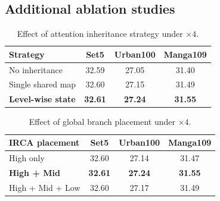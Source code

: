 \subsection{Additional ablation studies}
\begin{table}[t]
\centering
\caption{Effect of head split strategy under \(\times4\).}
\label{tab:head-split}
\end{table}

\begin{table}[t]
\centering
\caption{Effect of attention inheritance strategy under \(\times4\).}
\label{tab:inheritance}
\begin{tabular}{lccc}
\toprule
Strategy & Set5 & Urban100 & Manga109 \\
\midrule
No inheritance & 32.59 & 27.05 & 31.40 \\
Single shared map & 32.60 & 27.15 & 31.49 \\
\textbf{Level-wise state} & \textbf{32.61} & \textbf{27.24} & \textbf{31.55} \\
\bottomrule
\end{tabular}
\end{table}

\begin{table}[t]
\centering
\caption{Effect of global branch placement under \(\times4\).}
\label{tab:irca-placement}
\begin{tabular}{lccc}
\toprule
IRCA placement & Set5 & Urban100 & Manga109 \\
\midrule
High only & 32.60 & 27.14 & 31.47 \\
\textbf{High + Mid} & \textbf{32.61} & \textbf{27.24} & \textbf{31.55} \\
High + Mid + Low & 32.60 & 27.17 & 31.49 \\
\bottomrule
\end{tabular}
\end{table}

